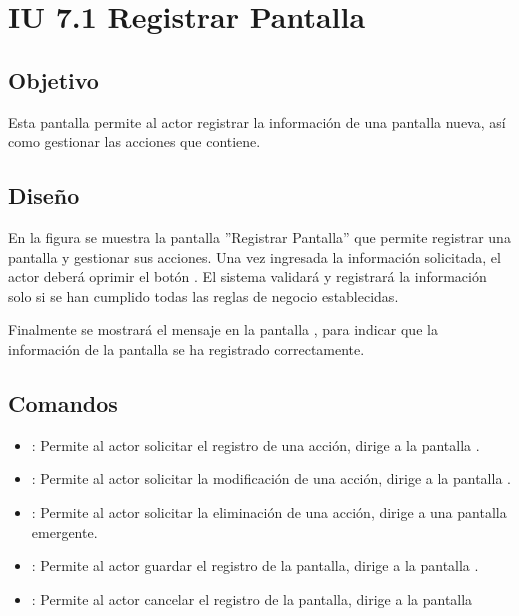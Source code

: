 \section{IU 7.1 Registrar Pantalla}

\subsection{Objetivo}
	Esta pantalla permite al actor registrar la información de una pantalla nueva, así como gestionar las acciones que contiene.
\subsection{Diseño}
	En la figura  se muestra la pantalla ''Registrar Pantalla'' que permite registrar una pantalla y gestionar sus acciones.
	Una vez ingresada la información solicitada, el actor deberá oprimir el botón  . El sistema validará y registrará la información solo si se han cumplido todas las reglas de negocio establecidas.
	
	Finalmente se mostrará el mensaje  en la pantalla , para indicar que la información de la pantalla se ha registrado correctamente.

\subsection{Comandos}
\begin{itemize}
	\item {}: Permite al actor solicitar el registro de una acción, dirige a la pantalla .
	\item \editar [Modificar]: Permite al actor solicitar la modificación de una acción, dirige a la pantalla .
	\item \eliminar [Eliminar]: Permite al actor solicitar la eliminación de una acción, dirige a una pantalla emergente.
	\item {}: Permite al actor guardar el registro de la pantalla, dirige a la pantalla .
	\item {}: Permite al actor cancelar el registro de la pantalla, dirige a la pantalla 
\end{itemize}

